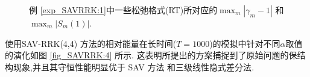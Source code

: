 \begin{figure}[H]
	\begin{center}
	\caption{例 \ref{exp_SAVRRK:1}中一些松弛格式(RT)所对应的$\max_m\left|\gamma_m-1\right|$ 和 $\max_m\left|S_m(1)\right|$.}
	\label{fig_SAVRRK:1}
	\end{center}
	\end{figure}
	使用SAV-RRK(4,4) 方法的相对能量在长时间($T=1000$)的模拟中针对不同$\alpha$取值的演化如图 \ref{fig_SAVRRK:4} 所示.
	这表明所提出的方案捕捉到了原始问题的保结构现象,并且其守恒性能明显优于 SAV 方法\cite{chengConvergenceEnergyconservingScheme2022} 和三级线性隐式差分法\cite{wangConservativeLinearizedDifference2015}.	

